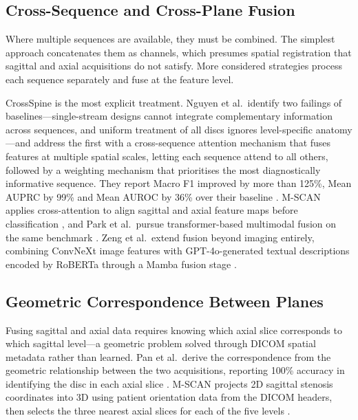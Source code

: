 \subsection{Cross-Sequence and Cross-Plane Fusion}
\label{sec:lr-fusion}

Where multiple sequences are available, they must be combined. The simplest
approach concatenates them as channels, which presumes spatial registration that
sagittal and axial acquisitions do not satisfy. More considered strategies
process each sequence separately and fuse at the feature level.

CrossSpine is the most explicit treatment. Nguyen et al.\ identify two failings
of baselines---single-stream designs cannot integrate complementary information
across sequences, and uniform treatment of all discs ignores level-specific
anatomy---and address the first with a cross-sequence attention mechanism that
fuses features at multiple spatial scales, letting each sequence attend to all
others, followed by a weighting mechanism that prioritises the most
diagnostically informative sequence. They report Macro F1 improved by more than
125\%, Mean AUPRC by 99\% and Mean AUROC by 36\% over their baseline
\cite{nguyen2026crossspine}. M-SCAN applies cross-attention to align sagittal and
axial feature maps before classification \cite{batra2025mscan}, and Park et al.\
pursue transformer-based multimodal fusion on the same benchmark
\cite{park2025multiview}. Zeng et al.\ extend fusion beyond imaging entirely,
combining ConvNeXt image features with GPT-4o-generated textual descriptions
encoded by RoBERTa through a Mamba fusion stage \cite{zeng2025gpt4lfs}.

\subsection{Geometric Correspondence Between Planes}
\label{sec:lr-geometry}

Fusing sagittal and axial data requires knowing which axial slice corresponds to
which sagittal level---a geometric problem solved through DICOM spatial
metadata rather than learned. Pan et al.\ derive the correspondence from the
geometric relationship between the two acquisitions, reporting 100\% accuracy in
identifying the disc in each axial slice \cite{pan2021automatically}. M-SCAN
projects 2D sagittal stenosis coordinates into 3D using patient orientation data
from the DICOM headers, then selects the three nearest axial slices for each of
the five levels \cite{batra2025mscan}.

